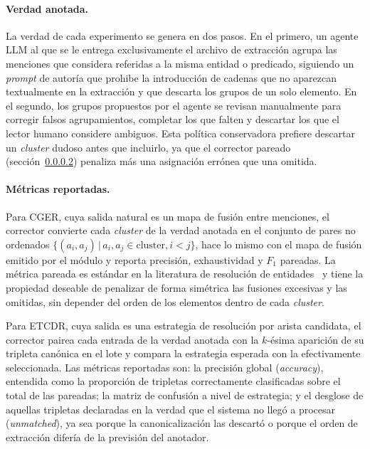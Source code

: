 \paragraph{Verdad anotada.} La verdad de cada experimento se genera en dos pasos. En el primero, un agente LLM al que se le entrega exclusivamente el archivo de extracción agrupa las menciones que considera referidas a la misma entidad o predicado, siguiendo un \emph{prompt} de autoría que prohibe la introducción de cadenas que no aparezcan textualmente en la extracción y que descarta los grupos de un solo elemento. En el segundo, los grupos propuestos por el agente se revisan manualmente para corregir falsos agrupamientos, completar los que falten y descartar los que el lector humano considere ambiguos. Esta política conservadora prefiere descartar un \emph{cluster} dudoso antes que incluirlo, ya que el corrector pareado (sección~\ref{sec:eval-setup-metrics}) penaliza más una asignación errónea que una omitida.

\paragraph{Métricas reportadas.}\label{sec:eval-setup-metrics}
Para CGER, cuya salida natural es un mapa de fusión entre menciones, el corrector convierte cada \emph{cluster} de la verdad anotada en el conjunto de pares no ordenados $\{(a_i, a_j)\,|\,a_i, a_j \in \text{cluster}, i<j\}$, hace lo mismo con el mapa de fusión emitido por el módulo y reporta precisión, exhaustividad y $F_1$ pareadas. La métrica pareada es estándar en la literatura de resolución de entidades~\cite{TODO_pairwise_er} y tiene la propiedad deseable de penalizar de forma simétrica las fusiones excesivas y las omitidas, sin depender del orden de los elementos dentro de cada \emph{cluster}.

Para ETCDR, cuya salida es una estrategia de resolución por arista candidata, el corrector pairea cada entrada de la verdad anotada con la $k$-ésima aparición de su tripleta canónica en el lote y compara la estrategia esperada con la efectivamente seleccionada. Las métricas reportadas son: la precisión global (\emph{accuracy}), entendida como la proporción de tripletas correctamente clasificadas sobre el total de las pareadas; la matriz de confusión a nivel de estrategia; y el desglose de aquellas tripletas declaradas en la verdad que el sistema no llegó a procesar (\emph{unmatched}), ya sea porque la canonicalización las descartó o porque el orden de extracción difería de la previsión del anotador.

